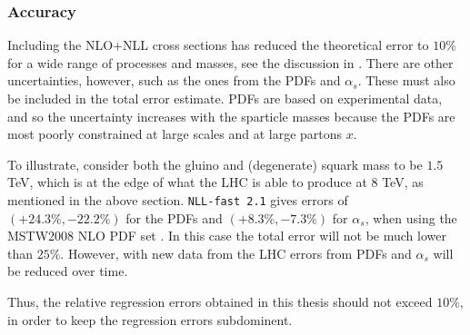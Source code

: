 \documentclass[twoside,english]{uiofysmaster}
\begin{document}
\subsubsection{Accuracy}

Including the NLO+NLL cross sections has reduced the theoretical error to $10 \%$ for a wide range of processes and masses, see the discussion in \cite{balazs2017colliderbit}. There are other uncertainties, however, such as the ones from the PDFs and $\alpha_s$. These must also be included in the total error estimate. PDFs are based on experimental data, and so the uncertainty increases with the sparticle masses because the PDFs are most poorly constrained at large scales and at large partons $x$.

To illustrate, consider both the gluino and (degenerate) squark mass to be $1.5$ TeV, which is at the edge of what the LHC is able to produce at 8 TeV, as mentioned in the above section. \verb|NLL-fast 2.1| gives errors of $(+24.3 \%, -22.2\%)$ for the PDFs and $(+8.3 \%, -7.3 \%)$ for $\alpha_s$, when using the MSTW2008 NLO PDF
set \cite{Martin:2009iq}. In this case the total error will not be much lower than $25 \%$. However, with new data from the LHC errors from PDFs and $\alpha_s$ will be reduced over time.

Thus, the relative regression errors obtained in this thesis should not exceed $10 \%$, in order to keep the regression errors subdominent.






\end{document}

